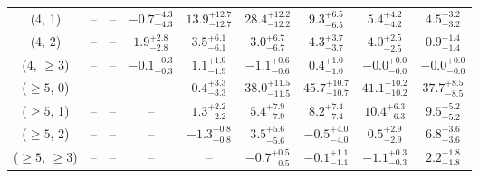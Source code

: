 \begin{table}[h!]
{\begin{tabular}{ccccccccc}
	(4, 1) & -- & -- & $-0.7^{+ 4.3 }_{- 4.3 }$ & $13.9^{+ 12.7 }_{- 12.7 }$ & $28.4^{+ 12.2 }_{- 12.2 }$ & $9.3^{+ 6.5 }_{- 6.5 }$ & $5.4^{+ 4.2 }_{- 4.2 }$ & $4.5^{+ 3.2 }_{- 3.2 }$ \\[0.5ex] 
	(4, 2) & -- & -- & $1.9^{+ 2.8 }_{- 2.8 }$ & $3.5^{+ 6.1 }_{- 6.1 }$ & $3.0^{+ 6.7 }_{- 6.7 }$ & $4.3^{+ 3.7 }_{- 3.7 }$ & $4.0^{+ 2.5 }_{- 2.5 }$ & $0.9^{+ 1.4 }_{- 1.4 }$ \\[0.5ex] 
	(4, $\ge3$) & -- & -- & $-0.1^{+ 0.3 }_{- 0.3 }$ & $1.1^{+ 1.9 }_{- 1.9 }$ & $-1.1^{+ 0.6 }_{- 0.6 }$ & $0.4^{+ 1.0 }_{- 1.0 }$ & $-0.0^{+ 0.0 }_{- 0.0 }$ & $-0.0^{+ 0.0 }_{- 0.0 }$ \\[0.5ex] 
	($\ge5$, 0) & -- & -- & -- & $0.4^{+ 3.3 }_{- 3.3 }$ & $38.0^{+ 11.5 }_{- 11.5 }$ & $45.7^{+ 10.7 }_{- 10.7 }$ & $41.1^{+ 10.2 }_{- 10.2 }$ & $37.7^{+ 8.5 }_{- 8.5 }$ \\[0.5ex] 
	($\ge5$, 1) & -- & -- & -- & $1.3^{+ 2.2 }_{- 2.2 }$ & $5.4^{+ 7.9 }_{- 7.9 }$ & $8.2^{+ 7.4 }_{- 7.4 }$ & $10.4^{+ 6.3 }_{- 6.3 }$ & $9.5^{+ 5.2 }_{- 5.2 }$ \\[0.5ex] 
	($\ge5$, 2) & -- & -- & -- & $-1.3^{+ 0.8 }_{- 0.8 }$ & $3.5^{+ 5.6 }_{- 5.6 }$ & $-0.5^{+ 4.0 }_{- 4.0 }$ & $0.5^{+ 2.9 }_{- 2.9 }$ & $6.8^{+ 3.6 }_{- 3.6 }$ \\[0.5ex] 
	($\ge5$, $\ge3$) & -- & -- & -- & -- & $-0.7^{+ 0.5 }_{- 0.5 }$ & $-0.1^{+ 1.1 }_{- 1.1 }$ & $-1.1^{+ 0.3 }_{- 0.3 }$ & $2.2^{+ 1.8 }_{- 1.8 }$ \\[0.5ex] 
	\hline
	\hline
\end{tabular}}
\end{table}

